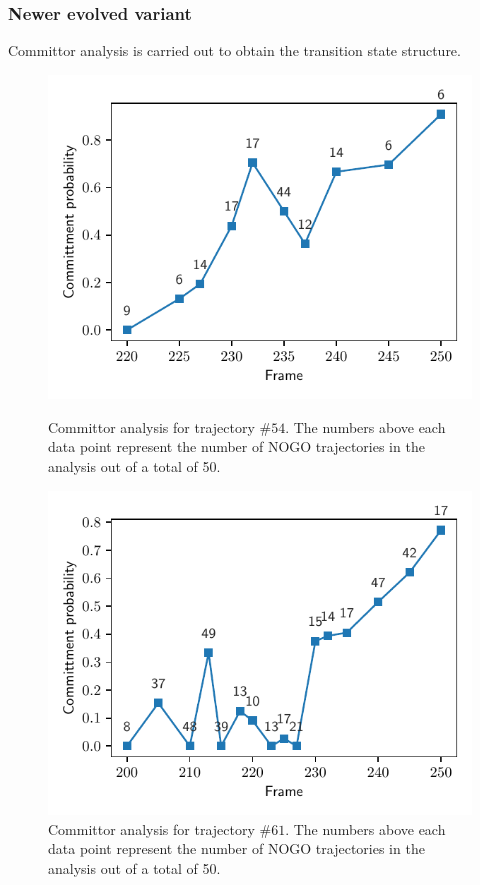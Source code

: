 \documentclass[%
preprint,
 amsmath,amssymb,
 aps,
prb,
]{revtex4-2}
\begin{document}
\subsubsection{Newer evolved variant}
Committor analysis is carried out to obtain the transition state structure.
\begin{figure}[ht!]
\centering
\begin{minipage}[b]{.4\textwidth}
\includegraphics[scale=0.75]{figures/dist54.pdf}
\caption{Committor analysis for trajectory $\#54$. The numbers above each data point represent the 
number of NOGO trajectories in the analysis out of a total of 50.}\label{fig:comm46}
\end{minipage}\qquad
\begin{minipage}[b]{.4\textwidth}
\includegraphics[scale=0.75]{figures/dist61.pdf}
\caption{Committor analysis for trajectory $\#61$. The numbers above each data point represent the 
number of NOGO trajectories in the analysis out of a total of 50.}\label{fig:comm54}
\end{minipage}
\end{figure}
\end{document}
